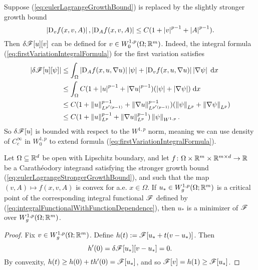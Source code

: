 \begin{remark}
    Suppose (\ref{eq:eulerLagrangeGrowthBound}) is replaced by the slightly stronger growth bound
    \begin{equation} \label{eq:eulerLagrangeStrongerGrowthBound}
        \left\lvert {\mathrm{D}_v f(x,v,A)} \right\rvert, \left\lvert {\mathrm{D}_A f(x,v,A)} \right\rvert \leq C(1 + \left\lvert {v} \right\rvert^{p-1} + \left\lvert {A} \right\rvert^{p-1}).
    \end{equation}
    Then $\delta\mathscr{F}[u][v]$ can be defined for $v \in W^{1,p}_0(\Omega;\mathbb{R}^m)$. Indeed, the integral formula (\ref{eq:firstVariationIntegralFormula}) for the first variation satisfies 
    \begin{equation} \begin{aligned}
        \left\lvert {\delta\mathscr{F}[u][\psi]} \right\rvert &\leq \int_\Omega \left\lvert { \mathrm{D}_A f(x,u,\nabla u) } \right\rvert \left\lvert {\psi} \right\rvert + \left\lvert { \mathrm{D}_v f(x,u,\nabla u) } \right\rvert                                           \left\lvert {\nabla \psi} \right\rvert \; \mathrm{d} x                                                           \\
                                   &\leq \int_\Omega C(1 + \left\lvert {u} \right\rvert^{p-1} + \left\lvert {\nabla u} \right\rvert^{p-1})(\left\lvert {\psi} \right\rvert 
                                       + \left\lvert {\nabla\psi} \right\rvert) \; \mathrm{d} x                                                            \\
                                   &\leq C(1 + \left\lVert {u} \right\rVert_{L^{p'(p-1)}}^{p-1} + \left\lVert {\nabla u} \right\rVert_{L^{p'(p-1)}}^{p-1})
                                         (\left\lVert {\psi} \right\rVert_{L^p} + \left\lVert {\nabla\psi} \right\rVert_{L^p})                                        \\
                                   &\leq C(1 + \left\lVert {u} \right\rVert_{L^p}^{p-1} + \left\lVert {\nabla u} \right\rVert_{L^p}^{p-1})\left\lVert {\psi} \right\rVert_{W^{1,p}}.
    \end{aligned} \end{equation}
    So $\delta\mathscr{F}[u]$ is bounded with respect to the $W^{1,p}$ norm, meaning we can use density of $C_c^\infty$ in $W^{1,p}_0$ to extend formula (\ref{eq:firstVariationIntegralFormula}).
\end{remark}
\begin{proposition} \label{prop:convexityImpliesSolutionsOfEulerLagrangeAreMinimizers}
    Let $\Omega \subseteq \mathbb{R}^d$ be open with Lipschitz boundary, and let $f \colon \Omega \times \mathbb{R}^m \times \mathbb{R}^{m \times d} \to \mathbb{R}$ be a Carath\'eodory integrand satisfying the stronger growth bound (\ref{eq:eulerLagrangeStrongerGrowthBound}), and such that the map $(v,A) \mapsto f(x,v,A)$ is convex for a.e. $x \in \Omega$. If $u_* \in W^{1,p}_g(\Omega;\mathbb{R}^m)$ is a critical point of the corresponding integral functional $\mathscr{F}$ defined by (\ref{eq:integralFunctionalWithFunctionDependence}), then $u_*$ is a minimizer of $\mathscr{F}$ over $W^{1,p}_g(\Omega;\mathbb{R}^m)$.
\end{proposition}
\begin{proof}
    Fix $v \in W^{1,p}_g(\Omega;\mathbb{R}^m)$. Define $h(t) := \mathscr{F}[u_* + t(v-u_*)]$. Then 
    \begin{equation}
        h'(0) = \delta\mathscr{F}[u_*][v-u_*] = 0.
    \end{equation}
    By convexity, $h(t) \geq h(0) + th'(0) = \mathscr{F}[u_*]$, and so $\mathscr{F}[v] = h(1) \geq \mathscr{F}[u_*]$.
\end{proof}

